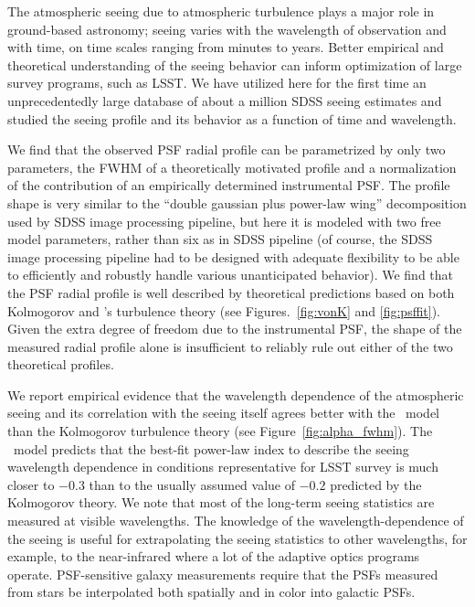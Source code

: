 
 
The atmospheric seeing due to atmospheric turbulence plays a major role in 
ground-based astronomy; seeing varies with the wavelength of observation
and with time, on time scales ranging from minutes to years. Better empirical
and theoretical understanding of the seeing behavior can inform optimization 
of large survey programs, such as LSST. We have utilized here for the first 
time an unprecedentedly large database of about a million SDSS seeing estimates
and studied the seeing profile and its behavior as a function of time and wavelength.

We find that the observed PSF radial profile can be parametrized by only two parameters, 
the FWHM of a theoretically motivated profile and a normalization of the contribution 
of an empirically determined instrumental PSF. The profile shape is very similar to 
the ``double gaussian plus power-law wing'' decomposition used by SDSS image
processing pipeline, but here it is modeled with two free model parameters, rather 
than six as in SDSS pipeline (of course, the SDSS image processing pipeline had
to be designed with adequate flexibility to be able to efficiently and robustly 
handle various unanticipated behavior). We find that the PSF radial profile is well 
described by theoretical predictions based on both 
Kolmogorov and \vk's turbulence theory (see Figures.~\ref{fig:vonK} and \ref{fig:psffit}). 
Given the extra degree of freedom due to the instrumental PSF, the shape of the
measured radial profile alone 
is insufficient to reliably rule out either of the two theoretical profiles.  

We report empirical evidence that the wavelength dependence of the atmospheric 
seeing and its correlation with the seeing itself agrees better with the \vk~model 
than the Kolmogorov turbulence theory (see
Figure~\ref{fig:alpha_fwhm}). The \vk~model predicts that 
the best-fit power-law index to describe the seeing wavelength dependence in conditions 
representative for LSST survey is much closer to $-0.3$ than to the usually assumed value
of $-0.2$ predicted by the Kolmogorov theory. 
We note that most of the long-term seeing statistics are measured at visible 
wavelengths. The knowledge of the wavelength-dependence of the seeing is useful 
for extrapolating the seeing statistics to other wavelengths, for example, to
the near-infrared where a lot of the adaptive optics programs operate. 
PSF-sensitive galaxy measurements require that the PSFs measured from
stars be interpolated both spatially and in color into galactic PSFs.


